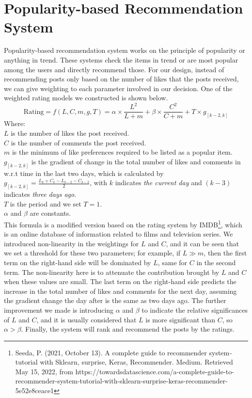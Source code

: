 \section{Popularity-based Recommendation System}
Popularity-based recommendation system works on the principle of popularity or anything in trend. These systems check the items in trend or are most popular among the users and directly recommend those. 
For our design, instead of recommending posts only based on the number of likes that the posts received, we can give weighting to each parameter involved in our decision. One of the weighted rating models we constructed is shown below.
\begin{equation*}
\text{Rating} = f(L,C,m,g,T) = \alpha \times \frac{L^{2}}{L+m} + \beta \times \frac{C^{2}}{C+m} + T \times g_{[k-2,k]}
\end{equation*}
Where:
\\$L$ is the number of likes the post received.
\\$C$ is the number of comments the post received.
\\$m$ is the minimum of like preferences required to be listed as a popular item.
\\$g_{[k-2,k]}$ is the gradient of change in the total number of likes and comments in w.r.t time in the last two days, which is calculated by 
$g_{[k-2,k]} = \frac{L_{k} + C_{k} -L_{k-2} -C_{k-2}}{2}$, with $k$ indicates \textit{the current day} and $(k-3)$ indicates \textit{three days ago}.
\\$T$ is the period and we set $T=1$.
\\ $\alpha$ and $\beta$ are constants.
\\This formula is a modified version based on the rating system by IMDB\footnote{Seeda, P. (2021, October 13). A complete guide to recommender system - tutorial with Sklearn, surprise, Keras, Recommender. Medium. Retrieved May 15, 2022, from https://towardsdatascience.com/a-complete-guide-to-recommender-system-tutorial-with-sklearn-surprise-keras-recommender-5e52e8ceace1}, which is an online database of information related to films and television series. We introduced non-linearity in the weightings for $L$ and $C$, and it can be seen that we set a threshold for these two parameters; for example, if $L \gg m$, then the first term on the right-hand side will be dominated by $L$, same for $C$ in the second term. The non-linearity here is to attenuate the contribution brought by $L$ and $C$ when these values are small. The last term on the right-hand side predicts the increase in the total number of likes and comments for the next day, assuming the gradient change the day after is the same as two days ago. The further improvement we made is introducing $\alpha$ and $\beta$ to indicate the relative significances of $L$ and $C$, and it is usually considered that $L$ is more significant than $C$, so $\alpha > \beta$. Finally, the system will rank and recommend the posts by the ratings.
